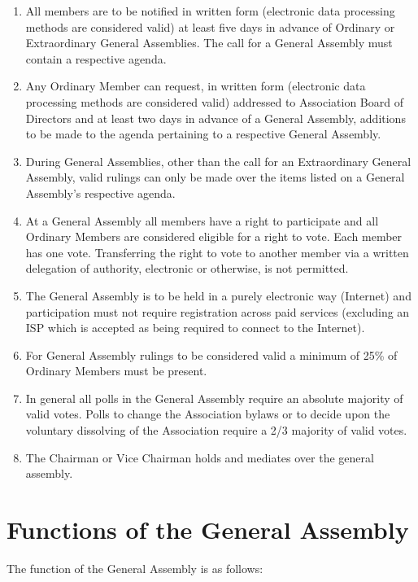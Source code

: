 \begin{enumerate}
\item All members are to be notified in written form (electronic data processing methods are considered valid) at least five days in advance of Ordinary or Extraordinary General Assemblies. The call for a General Assembly must contain a respective agenda.
\item Any Ordinary Member can request, in written form (electronic data processing methods are considered valid) addressed to Association Board of Directors and at least two days in advance of a General Assembly, additions to be made to the agenda pertaining to a respective General Assembly.
\item During General Assemblies, other than the call for an Extraordinary General Assembly, valid rulings can only be made over the items listed on a General Assembly’s respective agenda.
\item At a General Assembly all members have a right to participate and all Ordinary Members are considered eligible for a right to vote. Each member has one vote. Transferring the right to vote to another member via a written delegation of authority, electronic or otherwise, is not permitted.
\item The General Assembly is to be held in a purely electronic way (Internet) and participation must not require registration across paid services (excluding an ISP which is accepted as being required to connect to the Internet).
\item For General Assembly rulings to be considered valid a minimum of 25\% of Ordinary Members must be present.
\item In general all polls in the General Assembly require an absolute majority of valid votes. Polls to change the Association bylaws or to decide upon the voluntary dissolving of the Association require a 2/3 majority of valid votes.
\item The Chairman or Vice Chairman holds and mediates over the general assembly.
\end{enumerate}




\section{Functions of the General Assembly}

The function of the General Assembly is as follows:

